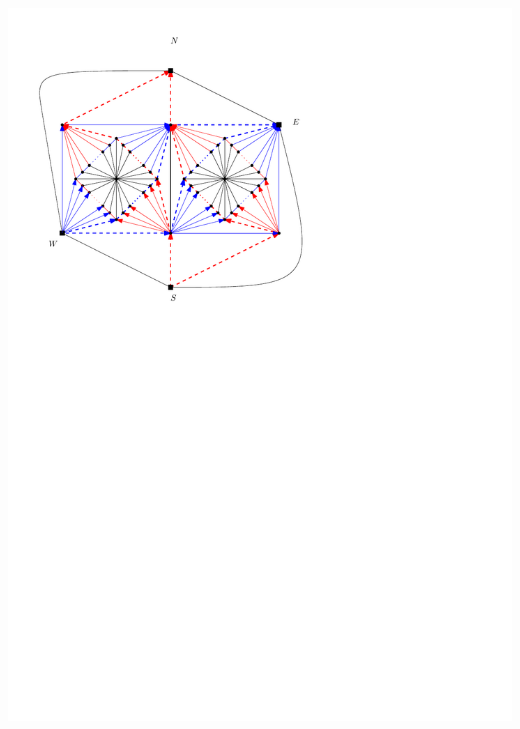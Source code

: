 \documentclass[a4paper]{article}
\begin{document}
\includegraphics[scale=1]{fixExtension/img/manymany4}
\clearpage%
\end{document}
